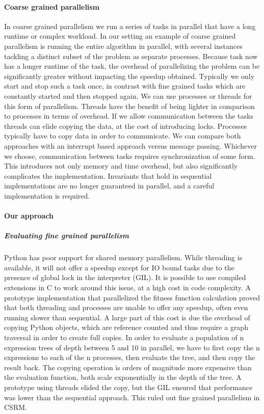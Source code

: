 \paragraph{Coarse grained parallelism}
In coarse grained parallelism we run a series of tasks in parallel that have a long runtime or complex workload. In our setting an example of coarse grained parallelism is running the entire algorithm in parallel, with several instances tackling a distinct subset of the problem as separate processes. Because task now has a longer runtime of the task, the overhead of parallelizing the problem can be significantly greater without impacting the speedup obtained. Typically we only start and stop such a task once, in contrast with fine grained tasks which are constantly started and then stopped again. We can use processes or threads for this form of parallelism. Threads have the benefit of being lighter in comparison to processes in terms of overhead. If we allow communication between the tasks threads can elide copying the data, at the cost of introducing locks. Processes typically have to copy data in order to communicate. We can compare both approaches with an interrupt based approach versus message passing. Whichever we choose, communication between tasks requires synchronization of some form. This introduces not only memory and time overhead, but also significantly complicates the implementation. Invariants that hold in sequential implementations are no longer guaranteed in parallel, and a careful implementation is required. 

\paragraph{Our approach}

\subparagraph{Evaluating fine grained parallelism}
Python has poor support for shared memory parallelism. While threading is available, it will not offer a speedup except for IO bound tasks due to the presence of global lock in the interpreter (GIL). It is possible to use compiled extensions in C to work around this issue, at a high cost in code complexity. A prototype implementation that parallelized the fitness function calculation proved that both threading and processes are unable to offer any speedup, often even running slower than sequential. A large part of this cost is due the overhead of copying Python objects, which are reference counted and thus require a graph traversal in order to create full copies. In order to evaluate a population of n expression trees of depth between 5 and 10 in parallel, we have to first copy the n expressions to each of the n processes, then evaluate the tree, and then copy the result back. The copying operation is orders of magnitude more expensive than the evaluation function, both scale exponentially in the depth of the tree. A prototype using threads elided the copy, but the GIL ensured that performance was lower than the sequential approach.
This ruled out fine grained parallelism in CSRM.

